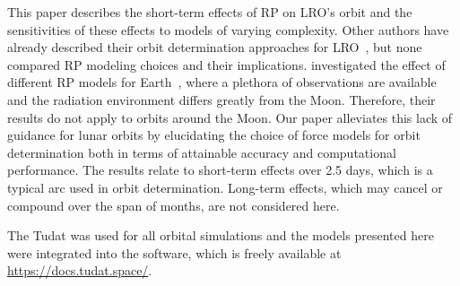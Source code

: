 This paper describes the short-term effects of \gls{RP} on \gls{LRO}'s orbit and the sensitivities of these effects to models of varying complexity. Other authors have already described their orbit determination approaches for \gls{LRO}~\cite{Mazarico2011,Mazarico2018,Nicholson2010,Smith2008,Slojkowski2014,Slojkowski2015,Bauer2016,Maier2016}, but none compared \gls{RP} modeling choices and their implications. \citeauthor{Vielberg2020} investigated the effect of different \gls{RP} models for Earth~\cite{Vielberg2020}, where a plethora of observations are available and the radiation environment differs greatly from the Moon. Therefore, their results do not apply to orbits around the Moon. Our paper alleviates this lack of guidance for lunar orbits by elucidating the choice of force models for orbit determination both in terms of attainable accuracy and computational performance. The results relate to short-term effects over 2.5 days, which is a typical arc used in orbit determination. Long-term effects, which may cancel or compound over the span of months, are not considered here.

The \gls{Tudat} was used for all orbital simulations and the models presented here were integrated into the software, which is freely available at \url{https://docs.tudat.space/}.

{\let\thefootnote\relax{}}
